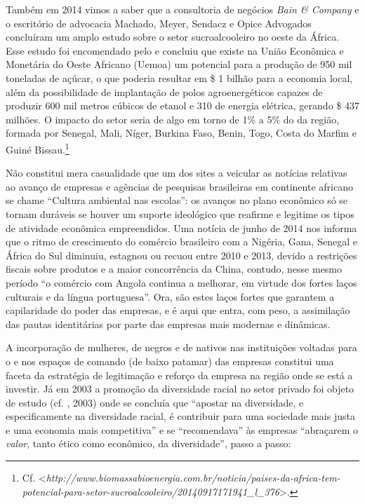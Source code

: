 Também em 2014 vimos a saber que a consultoria de negócios \emph{Bain \&
Company} e o escritório de advocacia Machado, Meyer, Sendacz e Opice
Advogados concluíram um amplo estudo sobre o setor sucroalcooleiro no
oeste da África. Esse estudo foi encomendado pelo  e concluiu que
existe na União Econômica e Monetária do Oeste Africano (Uemoa) um
potencial para a produção de 950 mil toneladas de açúcar, o que poderia
resultar em \$ 1 bilhão para a economia local, além da possibilidade
de implantação de polos agroenergéticos capazes de produzir 600 mil
metros cúbicos de etanol e 310  de energia elétrica, gerando \$ 437
milhões. O impacto do setor seria de algo em torno de 1\% a 5\% do 
da região, formada por Senegal, Mali, Níger, Burkina Faso, Benin, Togo,
Costa do Marfim e Guiné Bissau.\footnote{Cf.
  \textless{}\emph{http://www.biomassabioenergia.com.br/noticia/paises-da-africa-tem-potencial-para-setor-sucroalcooleiro/20140917171941\_l\_376}\textgreater{}.}

Não constitui mera casualidade que um dos sites a veicular as notícias
relativas ao avanço de empresas e agências de pesquisas brasileiras em
continente africano se chame ``Cultura ambiental nas escolas'': os
avanços no plano econômico só se tornam duráveis se houver um suporte
ideológico que reafirme e legitime os tipos de atividade econômica
empreendidos. Uma notícia de junho de 2014 nos informa que o ritmo de
crescimento do comércio brasileiro com a Nigéria, Gana, Senegal e África
do Sul diminuiu, estagnou ou recuou entre 2010 e 2013, devido a
restrições fiscais sobre produtos e a maior concorrência da China,
contudo, nesse mesmo período ``o comércio com Angola continua a
melhorar, em virtude dos fortes laços culturais e da língua
portuguesa''. Ora, são estes laços fortes que garantem a capilaridade do
poder das empresas, e é aqui que entra, com peso, a assimilação das
pautas identitárias por parte das empresas mais modernas e dinâmicas.

A incorporação de mulheres, de negros e de nativos nas instituições
voltadas para o  e nos espaços de comando (de baixo patamar) das
empresas constitui uma faceta da estratégia de legitimação e reforço da
empresa na região onde se está a investir. Já em 2003 a promoção da
diversidade racial no setor privado foi objeto de estudo (cf. ,
2003) onde se concluía que ``apostar na diversidade, e especificamente
na diversidade racial, é contribuir para uma sociedade mais justa e uma
economia mais competitiva'' e se ``recomendava'' às empresas ``abraçarem
o \emph{valor}, tanto ético como econômico, da diversidade'', passo a
passo:

